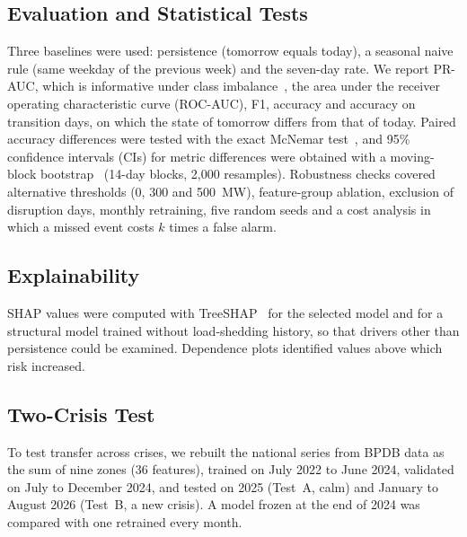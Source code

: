 \documentclass[conference]{IEEEtran}
\begin{document}
\subsection{Evaluation and Statistical Tests}
Three baselines were used: persistence (tomorrow equals today), a seasonal naive rule (same weekday of the previous week) and the seven-day rate. We report PR-AUC, which is informative under class imbalance~\cite{saito2015}, the area under the receiver operating characteristic curve (ROC-AUC), F1, accuracy and accuracy on transition days, on which the state of tomorrow differs from that of today. Paired accuracy differences were tested with the exact McNemar test~\cite{dietterich1998}, and 95\% confidence intervals (CIs) for metric differences were obtained with a moving-block bootstrap~\cite{kunsch1989} (14-day blocks, 2,000 resamples). Robustness checks covered alternative thresholds (0, 300 and 500~MW), feature-group ablation, exclusion of disruption days, monthly retraining, five random seeds and a cost analysis in which a missed event costs $k$ times a false alarm.

\subsection{Explainability}
SHAP values were computed with TreeSHAP~\cite{lundberg2020} for the selected model and for a structural model trained without load-shedding history, so that drivers other than persistence could be examined. Dependence plots identified values above which risk increased.

\subsection{Two-Crisis Test}
To test transfer across crises, we rebuilt the national series from BPDB data as the sum of nine zones (36 features), trained on July 2022 to June 2024, validated on July to December 2024, and tested on 2025 (Test~A, calm) and January to August 2026 (Test~B, a new crisis). A model frozen at the end of 2024 was compared with one retrained every month.
\end{document}
